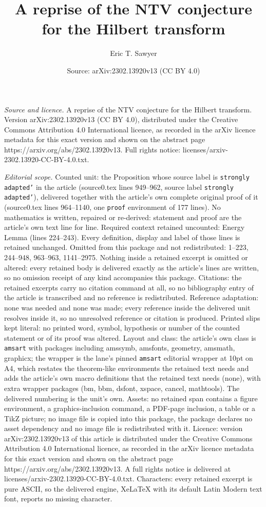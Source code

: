 \documentclass[10pt,a4paper]{amsart}
\title[A reprise of the NTV conjecture for the Hilbert transform]{A reprise of the NTV conjecture for the Hilbert transform}
\author{Eric T. Sawyer}
\date{Source: arXiv:2302.13920v13 (CC BY 4.0)}
\begin{document}
\maketitle

\noindent\emph{Source and licence.} A reprise of the NTV conjecture for the Hilbert transform. Version arXiv:2302.13920v13 (CC BY 4.0), distributed under the Creative Commons Attribution 4.0 International licence, as recorded in the arXiv licence metadata for this exact version and shown on the abstract page https://arxiv.org/abs/2302.13920v13. Full rights notice: licenses/arxiv-2302.13920-CC-BY-4.0.txt.\par\smallskip

\noindent\textit{Editorial scope.} Counted unit: the Proposition whose source label is \texttt{strongly adapted'} in the article (source0.tex lines 949--962, source label \texttt{strongly adapted'}), delivered together with the article's own complete original proof of it (source0.tex lines 964--1140, one \texttt{proof} environment of 177 lines). No mathematics is written, repaired or re-derived: statement and proof are the article's own text line for line. Required context retained uncounted: Energy Lemma (lines 224--243). Every definition, display and label of those lines is retained unchanged. Omitted from this package and not redistributed: 1--223, 244--948, 963--963, 1141--2975. Nothing inside a retained excerpt is omitted or altered: every retained body is delivered exactly as the article's lines are written, so no omission receipt of any kind accompanies this package. Citations: the retained excerpts carry no citation command at all, so no bibliography entry of the article is transcribed and no reference is redistributed. Reference adaptation: none was needed and none was made; every reference inside the delivered unit resolves inside it, so no unresolved reference or citation is produced. Printed slips kept literal: no printed word, symbol, hypothesis or number of the counted statement or of its proof was altered. Layout and class: the article's own class is \texttt{amsart} with packages including amssymb, amsfonts, geometry, amsmath, graphicx; the wrapper is the lane's pinned \texttt{amsart} editorial wrapper at 10pt on A4, which restates the theorem-like environments the retained text needs and adds the article's own macro definitions that the retained text needs (none), with extra wrapper packages (bm, bbm, dsfont, xspace, cancel, mathtools). The delivered numbering is the unit's own. Assets: no retained span contains a figure environment, a graphics-inclusion command, a PDF-page inclusion, a table or a TikZ picture; no image file is copied into this package, the package declares no asset dependency and no image file is redistributed with it. Licence: version arXiv:2302.13920v13 of this article is distributed under the Creative Commons Attribution 4.0 International licence, as recorded in the arXiv licence metadata for this exact version and shown on the abstract page https://arxiv.org/abs/2302.13920v13. A full rights notice is delivered at licenses/arxiv-2302.13920-CC-BY-4.0.txt. Characters: every retained excerpt is pure ASCII, so the delivered engine, XeLaTeX with its default Latin Modern text font, reports no missing character.
\end{document}
